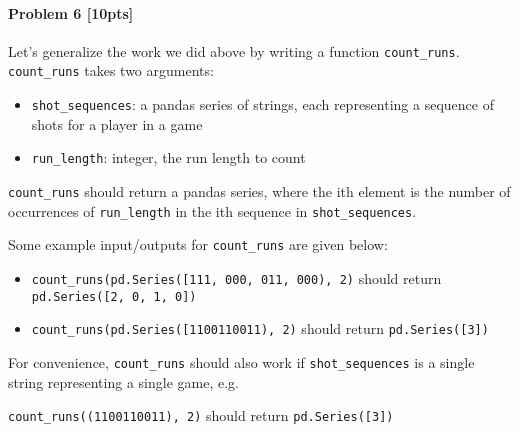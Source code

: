\documentclass[11pt]{article}
\providecommand{\tightlist}{%
      \setlength{\itemsep}{0pt}\setlength{\parskip}{0pt}}
\begin{document}
    \paragraph{Problem 6 {[}10pts{]}}\label{problem-6-10pts}

Let's generalize the work we did above by writing a function
\texttt{count\_runs}. \texttt{count\_runs} takes two arguments:

\begin{itemize}
\tightlist
\item
  \texttt{shot\_sequences}: a pandas series of strings, each
  representing a sequence of shots for a player in a game
\item
  \texttt{run\_length}: integer, the run length to count
\end{itemize}

\texttt{count\_runs} should return a pandas series, where the ith
element is the number of occurrences of \texttt{run\_length} in the ith
sequence in \texttt{shot\_sequences}.

Some example input/outputs for \texttt{count\_runs} are given below:

\begin{itemize}
\tightlist
\item
  \texttt{count\_runs(pd.Series({[}\textquotesingle{}111\textquotesingle{},\ \textquotesingle{}000\textquotesingle{},\ \textquotesingle{}011\textquotesingle{},\ \textquotesingle{}000\textquotesingle{}{]}),\ 2)}
  should return \texttt{pd.Series({[}2,\ 0,\ 1,\ 0{]})}
\item
  \texttt{count\_runs(pd.Series({[}\textquotesingle{}1100110011\textquotesingle{}{]}),\ 2)}
  should return \texttt{pd.Series({[}3{]})}
\end{itemize}

For convenience, \texttt{count\_runs} should also work if
\texttt{shot\_sequences} is a single string representing a single game,
e.g.

\texttt{count\_runs((1100110011),\ 2)} should return
\texttt{pd.Series({[}3{]})}
\end{document}
